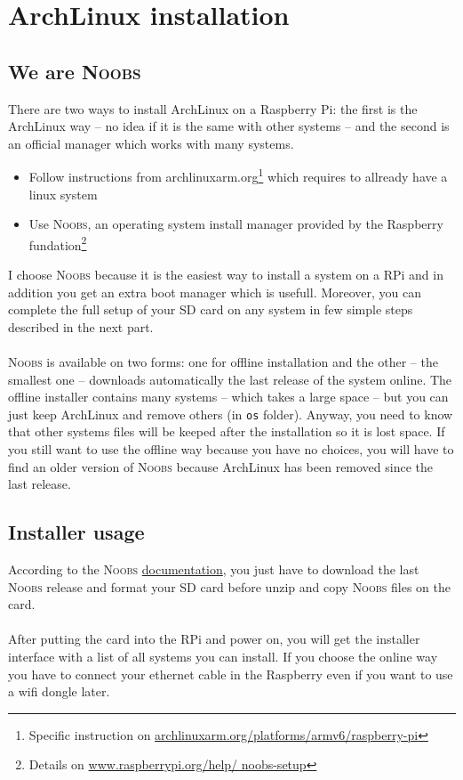 \chapter{ArchLinux installation}
\section{We are \textsc{Noobs}}
There are two ways to install ArchLinux on a Raspberry Pi: the first is 
the ArchLinux way -- no idea if it is the same with other systems -- and 
the second is an official manager which works with many systems.

\begin{itemize}
	\item Follow instructions from archlinuxarm.org\footnote{Specific 
		  instruction on \href{http://archlinuxarm.org/platforms/armv6/
		  raspberry-pi}{archlinuxarm.org/platforms/armv6/raspberry-pi}} which 
		  requires to allready have a linux system
		  
	\item Use \textsc{Noobs}, an operating system install manager provided by 
		  the Raspberry fundation\footnote{Details on \href{http://
		  www.raspberrypi.org/help/noobs-setup}{www.raspberrypi.org/help/
		  noobs-setup}}\\
\end{itemize}

I choose \textsc{Noobs} because it is the easiest way to install a
system on a RPi and in addition you get an extra \og{}boot manager\fg{} which 
is usefull. Moreover, you can complete the full setup of your SD card on any 
system in few simple steps described in the next part.
\\\\
\textsc{Noobs} is available on two forms: one for offline installation 
and the other -- the smallest one -- downloads automatically the last release 
of the system online. The offline installer contains many systems -- which 
takes a large space -- but you can just keep ArchLinux and remove others 
(in \texttt{os} folder). Anyway, you need to know that other systems files 
will be keeped after the installation so it is lost space. If you still want 
to use the offline way because you have no choices, you will have to find  
an older version of \textsc{Noobs} because ArchLinux has been removed since  
the last release.

\section{Installer usage}
According to the \textsc{Noobs} \href{http://www.raspberrypi.org/help/
noobs-setup}{documentation}, you just have to download the last \textsc{Noobs} 
release and format your SD card before unzip and copy \textsc{Noobs} files on 
the card.
\\\\
After putting the card into the RPi and power on, you will get the 
installer interface with a list of all systems you can install. If you choose 
the online way you have to connect your ethernet cable in the Raspberry even 
if you want to use a wifi dongle later.

